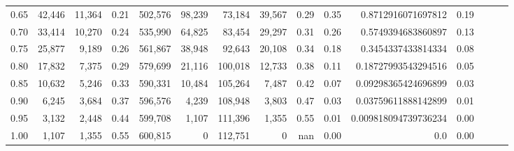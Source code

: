 \begin{tabular}{rrrrrrrrrrrrrrr}
0.65 &  42,446 &  11,364 &  0.21 &  502,576 &   98,239 &   73,184 &   39,567 &  0.29 &  0.35 &    0.8712916071697812 &      0.19 \\
0.70 &  33,414 &  10,270 &  0.24 &  535,990 &   64,825 &   83,454 &   29,297 &  0.31 &  0.26 &    0.5749394683860897 &      0.13 \\
0.75 &  25,877 &   9,189 &  0.26 &  561,867 &   38,948 &   92,643 &   20,108 &  0.34 &  0.18 &    0.3454337433814334 &      0.08 \\
0.80 &  17,832 &   7,375 &  0.29 &  579,699 &   21,116 &  100,018 &   12,733 &  0.38 &  0.11 &   0.18727993543294516 &      0.05 \\
0.85 &  10,632 &   5,246 &  0.33 &  590,331 &   10,484 &  105,264 &    7,487 &  0.42 &  0.07 &   0.09298365424696899 &      0.03 \\
0.90 &   6,245 &   3,684 &  0.37 &  596,576 &    4,239 &  108,948 &    3,803 &  0.47 &  0.03 &   0.03759611888142899 &      0.01 \\
0.95 &   3,132 &   2,448 &  0.44 &  599,708 &    1,107 &  111,396 &    1,355 &  0.55 &  0.01 &  0.009818094739736234 &      0.00 \\
1.00 &   1,107 &   1,355 &  0.55 &  600,815 &        0 &  112,751 &        0 &   nan &  0.00 &                   0.0 &      0.00 \\
\bottomrule
\end{tabular}
